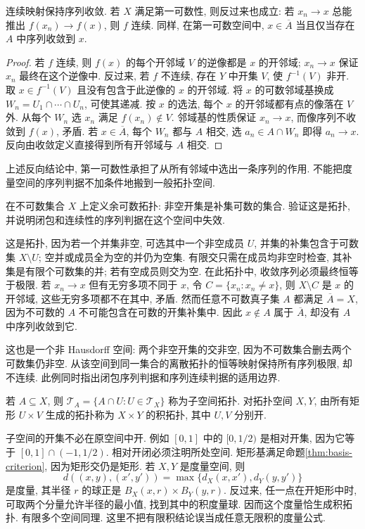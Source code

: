 \begin{proposition}\label{thm:first-countable-sequence}
连续映射保持序列收敛. 若 $X$ 满足第一可数性, 则反过来也成立: 若 $x_n\to x$ 总能推出 $f(x_n)\to f(x)$, 则 $f$ 连续. 同样, 在第一可数空间中, $x\in\overline A$ 当且仅当存在 $A$ 中序列收敛到 $x$.
\end{proposition}
\begin{proof}
若 $f$ 连续, 则 $f(x)$ 的每个开邻域 $V$ 的逆像都是 $x$ 的开邻域; $x_n\to x$ 保证 $x_n$ 最终在这个逆像中. 反过来, 若 $f$ 不连续, 存在 $Y$ 中开集 $V$, 使 $f^{-1}(V)$ 非开. 取 $x\in f^{-1}(V)$ 且没有包含于此逆像的 $x$ 的开邻域. 将 $x$ 的可数邻域基换成 $W_n=U_1\cap\cdots\cap U_n$, 可使其递减. 按 $x$ 的选法, 每个 $x$ 的开邻域都有点的像落在 $V$ 外. 从每个 $W_n$ 选 $x_n$ 满足 $f(x_n)\notin V$. 邻域基的性质保证 $x_n\to x$, 而像序列不收敛到 $f(x)$, 矛盾. 若 $x\in\overline A$, 每个 $W_n$ 都与 $A$ 相交, 选 $a_n\in A\cap W_n$ 即得 $a_n\to x$. 反向由收敛定义直接得到所有开邻域与 $A$ 相交.
\end{proof}
上述反向结论中, 第一可数性承担了从所有邻域中选出一条序列的作用. 不能把度量空间的序列判据不加条件地搬到一般拓扑空间.

\begin{example}\label{ex:cocountable}
在不可数集合 $X$ 上定义余可数拓扑: 非空开集是补集可数的集合. 验证这是拓扑, 并说明闭包和连续性的序列判据在这个空间中失效.
\end{example}
\begin{solution}
这是拓扑, 因为若一个并集非空, 可选其中一个非空成员 $U$, 并集的补集包含于可数集 $X\setminus U$; 空并或成员全为空的并仍为空集. 有限交只需在成员均非空时检查, 其补集是有限个可数集的并; 若有空成员则交为空. 在此拓扑中, 收敛序列必须最终恒等于极限. 若 $x_n\to x$ 但有无穷多项不同于 $x$, 令 $C=\{x_n:x_n\ne x\}$, 则 $X\setminus C$ 是 $x$ 的开邻域, 这些无穷多项都不在其中, 矛盾. 然而任意不可数真子集 $A$ 都满足 $\overline A=X$, 因为不可数的 $A$ 不可能包含在可数的开集补集中. 因此 $x\notin A$ 属于 $\overline A$, 却没有 $A$ 中序列收敛到它.

这也是一个非 Hausdorff 空间: 两个非空开集的交非空, 因为不可数集合删去两个可数集仍非空. 从该空间到同一集合的离散拓扑的恒等映射保持所有序列极限, 却不连续. 此例同时指出闭包序列判据和序列连续判据的适用边界.
\end{solution}

\begin{definition}
若 $A\subseteq X$, 则 $\mathcal T_A=\{A\cap U:U\in\mathcal T_X\}$ 称为子空间拓扑. 对拓扑空间 $X,Y$, 由所有矩形 $U\times V$ 生成的拓扑称为 $X\times Y$ 的积拓扑, 其中 $U,V$ 分别开.
\end{definition}
子空间的开集不必在原空间中开. 例如 $[0,1]$ 中的 $[0,1/2)$ 是相对开集, 因为它等于 $[0,1]\cap(-1,1/2)$. 相对开闭必须注明所处空间.
矩形基满足命题\ref{thm:basis-criterion}, 因为矩形交仍是矩形. 若 $X,Y$ 是度量空间, 则
\[
 d((x,y),(x',y'))=\max\{d_X(x,x'),d_Y(y,y')\}
\]
是度量, 其半径 $r$ 的球正是 $B_X(x,r)\times B_Y(y,r)$. 反过来, 任一点在开矩形中时, 可取两个分量允许半径的最小值, 找到其中的积度量球. 因而这个度量恰生成积拓扑. 有限多个空间同理. 这里不把有限积结论误当成任意无限积的度量公式.

